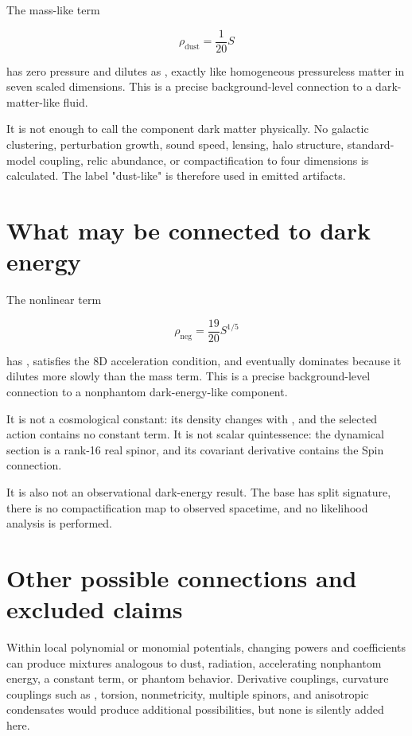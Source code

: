 \documentclass[11pt]{article}
\begin{document}
The mass-like term

\[
\rho_{\mathrm{dust}}=\frac1{20}S
\]

has zero pressure and dilutes as \texttt{}, exactly like homogeneous pressureless matter in seven scaled dimensions. This is a precise background-level connection to a dark-matter-like fluid.

It is not enough to call the component dark matter physically. No galactic clustering, perturbation growth, sound speed, lensing, halo structure, standard-model coupling, relic abundance, or compactification to four dimensions is calculated. The label "dust-like" is therefore used in emitted artifacts.

\section{What may be connected to dark energy}

The nonlinear term

\[
\rho_{\mathrm{neg}}=\frac{19}{20}S^{1/5}
\]

has \texttt{}, satisfies the 8D acceleration condition, and eventually dominates because it dilutes more slowly than the mass term. This is a precise background-level connection to a nonphantom dark-energy-like component.

It is not a cosmological constant: its density changes with \texttt{}, and the selected action contains no constant term. It is not scalar quintessence: the dynamical section is a rank-16 real spinor, and its covariant derivative contains the Spin connection.

It is also not an observational dark-energy result. The base has split signature, there is no compactification map to observed \texttt{} spacetime, and no likelihood analysis is performed.

\section{Other possible connections and excluded claims}

Within local polynomial or monomial potentials, changing powers and coefficients can produce mixtures analogous to dust, radiation, accelerating nonphantom energy, a constant term, or phantom behavior. Derivative couplings, curvature couplings such as \texttt{}, torsion, nonmetricity, multiple spinors, and anisotropic condensates would produce additional possibilities, but none is silently added here.
\end{document}
